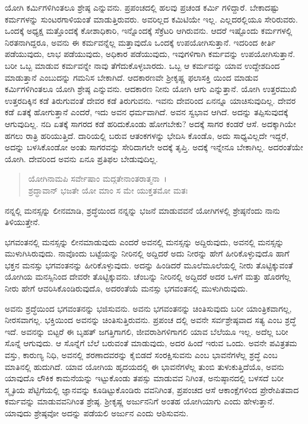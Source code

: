 ಯೋಗಿ ಕರ್ಮಿಗಳಿಗಿಂತಲೂ ಶ್ರೇಷ್ಠ ಎನ್ನುವನು. ಪ್ರಪಂಚದಲ್ಲಿ ಹಲವು ಪ್ರಚಂಡ ಕರ್ಮಿ ಗಳಿದ್ದಾರೆ. ಬೇಕಾದಷ್ಟು ಕರ್ಮಗಳನ್ನು ಸುಂಟರಗಾಳಿಯಂತೆ ಮಾಡುತ್ತಿರುವರು. ಅವರಿಲ್ಲದ ಕಮಿಟಿಯೇ ಇಲ್ಲ. ಎಲ್ಲದರಲ್ಲಿಯೂ ಸೇರಿರುವರು. ಒಂದಕ್ಕೆ ಅಧ್ಯಕ್ಷ ಮತ್ತೊಂದಕ್ಕೆ ಕೋಶಾಧಿಕಾರಿ, ಇನ್ನೊಂದಕ್ಕೆ ಸೆಕ್ರೆಟರಿ ಆಗಿರುವನು. ಆದರೆ ಇಷ್ಟೊಂದು ಕರ್ಮಗಳಲ್ಲಿ ನಿರತನಾಗಿದ್ದರೂ, ಅವನು ಈ ಕರ್ಮವನ್ನೆಲ್ಲ ಮತ್ತಾವುದೊ ಒಂದಕ್ಕೆ ಉಪಯೋಗಿಸುತ್ತಾನೆ. ಇದರಿಂದ ಕೀರ್ತಿ ಪಡೆಯುವುದು, ಲಾಭ ಪಡೆಯುವುದು, ಅಧಿಕಾರ ಪಡೆಯುವುದು, ಇವುಗಳಿಗಾಗಿ ಕರ್ಮವನ್ನು ಉಪಯೋಗಿಸುತ್ತಾನೆ. ಬರೀ ಒಬ್ಬ ಮಾಡುವ ಕರ್ಮವನ್ನೇ ನಾವು ತೆಗೆದುಕೊಳ್ಳಬಾರದು. ಒಬ್ಬ ಆ ಕರ್ಮವನ್ನು ಯಾವ ಉದ್ದೇಶದಿಂದ ಮಾಡುತ್ತಾನೆ ಎಂಬುದನ್ನು ಗಮನಿಸ ಬೇಕಾಗಿದೆ. ಆದಕಾರಣವೇ ಶ‍್ರೀಕೃಷ್ಣ ಫಲಾಸಕ್ತಿ ಯಿಂದ ಮಾಡುವ ಕರ್ಮಿಗಳಿಗಿಂತಲೂ ಯೋಗಿ ಶ್ರೇಷ್ಠ ಎನ್ನುವನು. ಆದಕಾರಣ ನೀನು ಯೋಗಿ ಆಗು ಎನ್ನುತ್ತಾನೆ. ಯೋಗಿ ಉತ್ತರಮುಖಿ ಉತ್ತರದಿಕ್ಕಿನ ಕಡೆ ತಿರುಗುವಂತೆ ದೇವರ ಕಡೆ ತಿರುಗುವನು. ಇವನು ದೇವರಿಂದ ಏನನ್ನೂ ಯಾಚಿಸುವುದಿಲ್ಲ. ದೇವರ ಕಡೆ ಏತಕ್ಕೆ ಹೋಗುತ್ತಾನೆ ಎಂದರೆ, ಇದು ಅವನ ಧರ್ಮವಾಗಿದೆ. ಅವನ ಸ್ವಭಾವ ಆಗಿದೆ. ಅದನ್ನು ತಪ್ಪಿಸುವುದಕ್ಕೆ ಆಗುವುದಿಲ್ಲ. ನದಿ ಏತಕ್ಕೆ ಸಾಗರದ ಕಡೆ ಹರಿದುಕೊಂಡು ಹೋಗಬೇಕು? ಅದಕ್ಕೆ ಸಾಗರ ಕಂಡರೆ ಆಸೆ. ಅದಕ್ಕಾಗಿಯೇ ಹಗಲು ರಾತ್ರಿ ಹರಿಯುತ್ತಿದೆ. ದಾರಿಯಲ್ಲಿ ಬರುವ ಆತಂಕಗಳನ್ನು ಭೇದಿಸಿ ಕೊಂಡೊ, ಅದು ಸಾಧ್ಯವಿಲ್ಲದೇ ಇದ್ದರೆ, ಅದನ್ನು ಬಳಸಿಕೊಂಡೋ ಅಂತು ಸಾಗರವನ್ನು ಸೇರಿದಾಗಲೇ ಅದಕ್ಕೆ ತೃಪ್ತಿ. ಅದಕ್ಕೆ ಇನ್ನೇನೂ ಬೇಕಾಗಿಲ್ಲ. ಅದರಂತೆಯೇ ಯೋಗಿ. ದೇವರಿಂದ ಅವನು ಏನೂ ಪ್ರತಿಫಲ ಬೇಡುವುದಿಲ್ಲ.

\begin{verse}
ಯೋಗಿನಾಮಪಿ ಸರ್ವೇಷಾಂ ಮದ್ಗತೇನಾಂತರಾತ್ಮನಾ~।\\ಶ್ರದ್ಧಾವಾನ್ ಭಜತೇ ಯೋ ಮಾಂ ಸ ಮೇ ಯುಕ್ತತಮೋ ಮತಃ 
\end{verse}

{\small ನನ್ನಲ್ಲಿ ಮನಸ್ಸನ್ನು ಲೀನಮಾಡಿ, ಶ್ರದ್ಧೆಯಿಂದ ನನ್ನನ್ನು ಭಜನೆ ಮಾಡುವವನೆ ಯೋಗಿಗಳಲ್ಲಿ ಶ್ರೇಷ್ಠನೆಂದು ನಾನು ತಿಳಿಯುತ್ತೇನೆ.}

ಭಗವಂತನಲ್ಲಿ ಮನಸ್ಸನ್ನು ಲೀನಮಾಡುವುದು ಎಂದರೆ ಅವನಲ್ಲಿ ಮನಸ್ಸನ್ನು ಅದ್ದಿರುವುದು, ಅವನಲ್ಲಿ ಮನಸ್ಸನ್ನು ಮುಳುಗಿಸಿರುವುದು. ನಾವೊಂದು ಬಟ್ಟೆಯನ್ನು ನೀರಿನಲ್ಲಿ ಅದ್ದಿದರೆ ಅದು ನೀರನ್ನು ಹೇಗೆ ಹೀರಿಕೊಳ್ಳುವುದೊ ಹಾಗೆ ಭಕ್ತನ ಮನಸ್ಸು ಭಗವಂತನನ್ನು ಹೀರಿಕೊಳ್ಳುವುದು. ಅದನ್ನು ಹಿಂಡಿದರೆ ಮೂಲೆಮೂಲೆಯಲ್ಲಿ ನೀರು ತೊಟ್ಟಿಕ್ಕುವಂತೆ ಯೋಗಿಯ ಮನಸ್ಸಿನಿಂದ ದೇವರೇ ತೊಟ್ಟಿಕ್ಕುವನು. ಚೆಂಬನ್ನು ನೀರಿನಲ್ಲಿ ಅದ್ದಿದರೆ ಅದರ ಒಳಗೆ ಮತ್ತು ಹೊರಗೆಲ್ಲ ನೀರು ಹೇಗೆ ಆವರಿಸಿಕೊಂಡಿರುವುದೊ, ಅದರಂತೆಯೆ ಮನಸ್ಸು ಭಗವಂತನಲ್ಲಿ ಮುಳುಗಿರುವುದು. 

ಅವನು ಶ್ರದ್ಧೆಯಿಂದ ಭಗವಂತನನ್ನು ಭಜಿಸುವನು. ಅವನು ಭಗವಂತನನ್ನು ಚಿಂತಿಸುವುದು ಬರೀ ಯಾಂತ್ರಿಕವಾಗಲ್ಲ, ನೀರಸವಾಗಲ್ಲ. ಭಕ್ತಿಯಿಂದ ಅವನನ್ನು ಚಿಂತಿಸುತ್ತಿರುವನು. ಪ್ರಪಂಚ ದಲ್ಲಿ ಅವನೇ ಸರ್ವಶ್ರೇಷ್ಠವಾದ ಸತ್ಯ ಎಂಬ ಶ್ರದ್ಧೆ ಇದೆ. ಅವನನ್ನು ಬಿಟ್ಟರೆ ಈ ಬೃಹತ್ ಜಗತ್ತಿಗಾಗಲಿ, ಜೀವರಾಶಿಗಳಿಗಾಗಲಿ ಯಾವ ಬೆಲೆಯೂ ಇಲ್ಲ. ಅದೆಲ್ಲ ಬರೀ ಸೊನ್ನೆ ಆಗುವುದು. ಆ ಸೊನ್ನೆಗೆ ಬೆಲೆ ಬರುವಂತೆ ಮಾಡುವುದು, ಅದರ ಹಿಂದೆ ಇರುವ ಒಂದು. ಅವನೇ ಪವಿತ್ರತಮ ವಸ್ತು, ಕಾರುಣ್ಯ ನಿಧಿ, ಅವನಲ್ಲಿ ಶರಣಾದವರನ್ನು ಕೈಬಿಡದೆ ಸಂರಕ್ಷಿಸುವನು ಎಂಬ ಭಾವನೆಗಳೆಲ್ಲ ಶ್ರದ್ಧೆ ಎಂಬ ಮಾತಿನಲ್ಲಿ ಹುದುಗಿದೆ. ಯಾವ ಯೋಗಿಯ ಹೃದಯದಲ್ಲಿ ಈ ಭಾವನೆಗಳೆಲ್ಲ ತುಂಬಿ ತುಳುಕುತ್ತಿದೆಯೊ, ಅವನು ಯಾವುದೊ ಲೌಕಿಕ ಕಾಮನೆಯನ್ನು ಇಟ್ಟುಕೊಂಡು ತಪಸ್ಸು ಮಾಡುವವ ನಿಗಿಂತ, ಅನುಷ್ಠಾನದಲ್ಲಿ ಬಳಸದೆ ಬರೀ ಸ್ಮೃತಿಯ ಪೆಟ್ಟಿಗೆಯಲ್ಲಿ ಜ್ಞಾನವನ್ನು ಕೂಡಿಟ್ಟುಕೊಂಡಿರು ವವನಿಗಿಂತ, ಪ್ರಪಂಚದ ಆಸೆ ಆಕಾಂಕ್ಷೆಗಳಿಂದ ಪ್ರೇರೇಪಿತವಾದ ಕರ್ಮವನ್ನು ಮಾಡುವವನಿಗಿಂತ ಶ್ರೇಷ್ಠ. ಶ‍್ರೀಕೃಷ್ಣ ಅರ್ಜುನನಿಗೆ ಅಂತಹ ಯೋಗಿಯಾಗು ಎಂದು ಹೇಳುತ್ತಾನೆ. ಯಾವುದು ಶ್ರೇಷ್ಠವೋ ಅದನ್ನು ಪಡೆಯಲಿ ಅರ್ಜುನ ಎಂದು ಆಶಿಸುವನು. 

